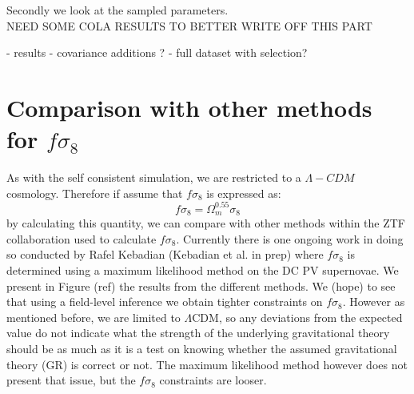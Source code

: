 Secondly we look at the sampled parameters. \\


NEED SOME COLA RESULTS TO BETTER WRITE OFF THIS PART

- results
 - covariance additions ?
 - full dataset with selection?

\section{Comparison with other methods for $f\sigma_8$}

As with the self consistent simulation, we are restricted to a $\Lambda-CDM$ cosmology. Therefore if assume that $f\sigma_8$ is expressed as:
\begin{equation}
    f \sigma_8 = \Omega_m^{0.55} \sigma_8
\end{equation}
by calculating this quantity, we can compare with other methods within the ZTF collaboration used to calculate $f\sigma_8$. Currently there is one ongoing work in doing so conducted by 
Rafel Kebadian (Kebadian et al. in prep) where $f\sigma_8$ is determined using a maximum likelihood method on the DC PV supernovae. We present in Figure (ref) the results from the different methods. 
We (hope) to see that using a field-level inference we obtain tighter constraints on $f\sigma_8$. However as mentioned before, we are limited to $\Lambda$CDM, so any deviations from 
the expected value do not indicate what the strength of the underlying gravitational theory should be as much as it is a test on knowing whether the assumed gravitational theory (GR) 
is correct or not. The maximum likelihood method however does not present that issue, but the $f\sigma_8$ constraints are looser.